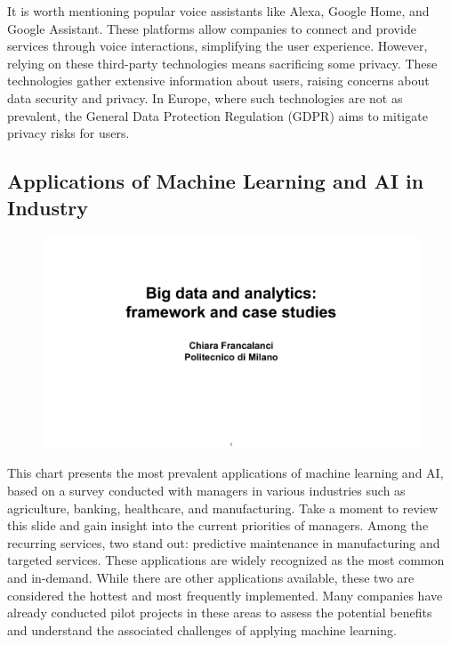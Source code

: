 It is worth mentioning popular voice assistants like Alexa, Google Home,
and Google Assistant. These platforms allow companies to connect and
provide services through voice interactions, simplifying the user
experience. However, relying on these third-party technologies means
sacrificing some privacy. These technologies gather extensive
information about users, raising concerns about data security and
privacy. In Europe, where such technologies are not as prevalent, the
General Data Protection Regulation (GDPR) aims to mitigate privacy risks
for users.


\subsection{Applications of Machine Learning and AI in
    Industry}\label{applications-of-machine-learning-and-ai-in-industry}


\begin{figure}[!h]
    \centering
    \includegraphics[page=19, trim = 0cm 1.5cm 1.5cm 0.7cm, clip, width=\textwidth]{images/06 - BIG_DATA.pdf}
\end{figure}

This chart presents the most prevalent applications of machine learning
and AI, based on a survey conducted with managers in various industries
such as agriculture, banking, healthcare, and manufacturing. Take a
moment to review this slide and gain insight into the current priorities
of managers. Among the recurring services, two stand out: predictive
maintenance in manufacturing and targeted services. These applications
are widely recognized as the most common and in-demand. While there are
other applications available, these two are considered the hottest and
most frequently implemented. Many companies have already conducted pilot
projects in these areas to assess the potential benefits and understand
the associated challenges of applying machine learning.

